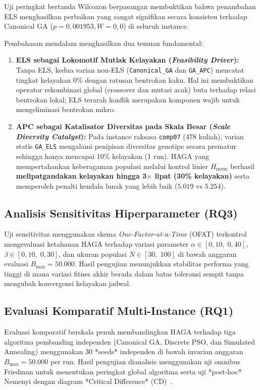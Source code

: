 \documentclass[journal]{IEEEtran}
\begin{document}
Uji peringkat bertanda Wilcoxon berpasangan membuktikan bahwa penambahan ELS menghasilkan perbaikan yang sangat signifikan secara konsisten terhadap Canonical GA ($p = 0{,}001953, W = 0{,}0$) di seluruh instance. 

Pembahasan mendalam menghasilkan dua temuan fundamental:
\begin{enumerate}
    \item \textbf{ELS sebagai Lokomotif Mutlak Kelayakan (\textit{Feasibility Driver}):} Tanpa ELS, kedua varian non-ELS (\texttt{Canonical\_GA} dan \texttt{GA\_APC}) mencatat tingkat kelayakan 0\% dengan ratusan bentrokan kaku. Hal ini membuktikan operator rekombinasi global (crossover dan mutasi acak) buta terhadap relasi bentrokan lokal; ELS terarah konflik merupakan komponen wajib untuk mengeliminasi bentrokan mikro.
    \item \textbf{APC sebagai Katalisator Diversitas pada Skala Besar (\textit{Scale Diversity Catalyst}):} Pada instance raksasa \texttt{comp07} (478 kuliah), varian statis \texttt{GA\_ELS} mengalami penipisan diversitas genotipe secara prematur sehingga hanya mencapai 10\% kelayakan (1 run). HAGA yang mempertahankan keberagaman populasi melalui kontrol linier $H_{\text{norm}}$ berhasil \textbf{melipatgandakan kelayakan hingga 3$\times$ lipat (30\% kelayakan)} serta memperoleh penalti kendala lunak yang lebih baik ($5.019$ vs $5.254$).
\end{enumerate}

\subsection{Analisis Sensitivitas Hiperparameter (RQ3)}
Uji sensitivitas menggunakan skema \textit{One-Factor-at-a-Time} (OFAT) terkontrol mengevaluasi ketahanan HAGA terhadap variasi parameter $\alpha \in [0{,}10, \; 0{,}40]$, $\beta \in [0{,}10, \; 0{,}30]$, dan ukuran populasi $N \in [30, \; 100]$ di bawah anggaran evaluasi $B_{\max} = 50.000$. Hasil pengujian menunjukkan stabilitas performa yang tinggi di mana variasi fitnes akhir berada dalam batas toleransi sempit tanpa mengubah konvergensi kelayakan jadwal.

\subsection{Evaluasi Komparatif Multi-Instance (RQ1)}
Evaluasi komparatif berskala penuh membandingkan HAGA terhadap tiga algoritma pembanding independen (Canonical GA, Discrete PSO, dan Simulated Annealing) menggunakan 30 *seeds* independen di bawah invarian anggaran $B_{\max} = 50.000$ per run. Hasil pengujian dianalisis menggunakan uji omnibus Friedman untuk menentukan peringkat global algoritma serta uji *post-hoc* Nemenyi dengan diagram *Critical Difference* (CD)~\cite{demsar2006statistical}.
\end{document}

